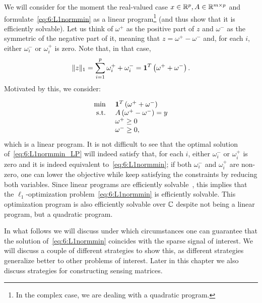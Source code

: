 \begin{remark}
We will consider for the moment the real-valued case $x\in\mathbb{R}^p, A\in\mathbb{R}^{m\times p}$ and formulate~\eqref{eq:6:L1normmin} as a linear program\footnote{In the complex case, we are dealing with a quadratic program.} (and thus show that it is efficiently solvable). Let us think of $\omega^{+}$ as the positive part of $z$ and $\omega^{-}$ as the symmetric of the negative part of it, meaning that $z = \omega^{+} - \omega^{-}$ and, for each $i$, either $\omega^{-}_i$ or $\omega^{+}_i$ is zero. Note that, in that case,
\[
\|z\|_1 = \sum_{i=1}^p \omega^{+}_i + \omega^{-}_i = \mathbf{1}^T \left(  \omega^{+} + \omega^{-} \right).
\]
Motivated by this, we consider:

\begin{equation}\label{eq:6:L1normmin_LP}
\begin{array}{cl}
\min \,\, &  \mathbf{1}^T \left(  \omega^{+} + \omega^{-} \right) \\
\text{s.t.} & A\left( \omega^{+} - \omega^{-} \right) = y \\
 & \omega^{+} \geq 0 \\
 & \omega^{-} \geq 0,
\end{array}
\end{equation}
which is a linear program. It is not difficult to see that the optimal solution of~\eqref{eq:6:L1normmin_LP} will indeed satisfy that, for each $i$, either $\omega^{-}_i$ or $\omega^{+}_i$ is zero and it is indeed equivalent to~\eqref{eq:6:L1normmin}; if both $\omega^{-}_i$ and $\omega^{+}_i$ are non-zero, one can lower the objective while keep satisfying the constraints by reducing both variables. Since linear programs are efficiently solvable~\cite{LVanderberghe_SBoyd_book}, this implies that the $\ell_1$-optimization problem~\eqref{eq:6:L1normmin} is efficiently solvable. This optimization program is also efficiently solvable over $\mathbb{C}$ despite not being a linear program, but a quadratic program.
\end{remark}

In what follows we will discuss under which circumstances one can guarantee that the solution of~\eqref{eq:6:L1normmin} coincides with the sparse signal of interest. We will discuss a couple of different strategies to show this, as different strategies generalize better to other problems of interest. Later in this chapter we also discuss strategies for constructing sensing matrices.





